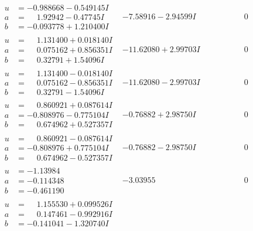 \documentclass[1p]{elsarticle_modified}
\theoremstyle{definition}
\begin{document}
$$\begin{array}{c|c|c}
\begin{aligned}
u &= -0.988668 - 0.549145 I \\
a &= \phantom{-}1.92942 - 0.47745 I \\
b &= -0.093778 + 1.210400 I\end{aligned}
 & -7.58916 - 2.94599 I & \phantom{-0.000000 } 0 \\ \hline\begin{aligned}
u &= \phantom{-}1.131400 + 0.018140 I \\
a &= \phantom{-}0.075162 + 0.856351 I \\
b &= \phantom{-}0.32791 + 1.54096 I\end{aligned}
 & -11.62080 + 2.99703 I & \phantom{-0.000000 } 0 \\ \hline\begin{aligned}
u &= \phantom{-}1.131400 - 0.018140 I \\
a &= \phantom{-}0.075162 - 0.856351 I \\
b &= \phantom{-}0.32791 - 1.54096 I\end{aligned}
 & -11.62080 - 2.99703 I & \phantom{-0.000000 } 0 \\ \hline\begin{aligned}
u &= \phantom{-}0.860921 + 0.087614 I \\
a &= -0.808976 - 0.775104 I \\
b &= \phantom{-}0.674962 + 0.527357 I\end{aligned}
 & -0.76882 + 2.98750 I & \phantom{-0.000000 } 0 \\ \hline\begin{aligned}
u &= \phantom{-}0.860921 - 0.087614 I \\
a &= -0.808976 + 0.775104 I \\
b &= \phantom{-}0.674962 - 0.527357 I\end{aligned}
 & -0.76882 - 2.98750 I & \phantom{-0.000000 } 0 \\ \hline\begin{aligned}
u &= -1.13984\phantom{ +0.000000I} \\
a &= -0.114348\phantom{ +0.000000I} \\
b &= -0.461190\phantom{ +0.000000I}\end{aligned}
 & -3.03955\phantom{ +0.000000I} & \phantom{-0.000000 } 0 \\ \hline\begin{aligned}
u &= \phantom{-}1.155530 + 0.099526 I \\
a &= \phantom{-}0.147461 - 0.992916 I \\
b &= -0.141041 - 1.320740 I\end{aligned}

\end{array}$$
\end{document}
